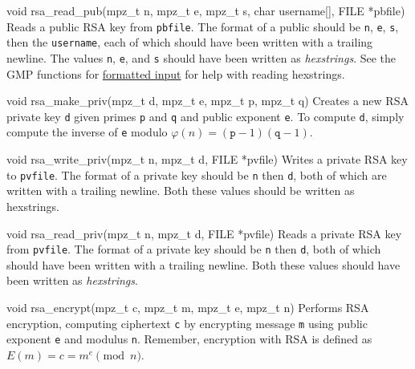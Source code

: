 \begin{funcdoc}{void rsa\_read\_pub(mpz\_t n, mpz\_t e, mpz\_t s,
char username[], FILE *pbfile)}
  Reads a public RSA key from \texttt{pbfile}. The format of a public
  should be \texttt{n}, \texttt{e}, \texttt{s}, then the
  \texttt{username}, each of which should have been written with a
  trailing newline. The values \texttt{n}, \texttt{e}, and \texttt{s}
  should have been written as \emph{hexstrings}. See the GMP functions
  for
  \href{https://gmplib.org/manual/Formatted-Input-Functions}{formatted
  input} for help with reading hexstrings.
\end{funcdoc}

\begin{funcdoc}{void rsa\_make\_priv(mpz\_t d, mpz\_t e, mpz\_t
p, mpz\_t q)}
  Creates a new RSA private key \texttt{d} given primes \texttt{p} and
  \texttt{q} and public exponent \texttt{e}. To compute \texttt{d},
  simply compute the inverse of \texttt{e} modulo $\varphi(n) =
  (\texttt{p} - 1)(\texttt{q} - 1)$.
\end{funcdoc}

\begin{funcdoc}{void rsa\_write\_priv(mpz\_t n, mpz\_t d, FILE
*pvfile)}
  Writes a private RSA key to \texttt{pvfile}. The format of a private key
  should be \texttt{n} then \texttt{d}, both of which are written with a
  trailing newline. Both these values should be written as hexstrings.
\end{funcdoc}

\begin{funcdoc}{void rsa\_read\_priv(mpz\_t n, mpz\_t d, FILE
*pvfile)}
  Reads a private RSA key from \texttt{pvfile}. The format of a private
  key should be \texttt{n} then \texttt{d}, both of which should have
  been written with a trailing newline. Both these values should have
  been written as \emph{hexstrings}.
\end{funcdoc}

\begin{funcdoc}{void rsa\_encrypt(mpz\_t c, mpz\_t m, mpz\_t e,
mpz\_t n)}
  Performs RSA encryption, computing ciphertext \texttt{c} by encrypting
  message \texttt{m} using public exponent \texttt{e} and modulus
  \texttt{n}. Remember, encryption with RSA is defined as $E(m) = c =
        m^e \pmod{n}$.
\end{funcdoc}

